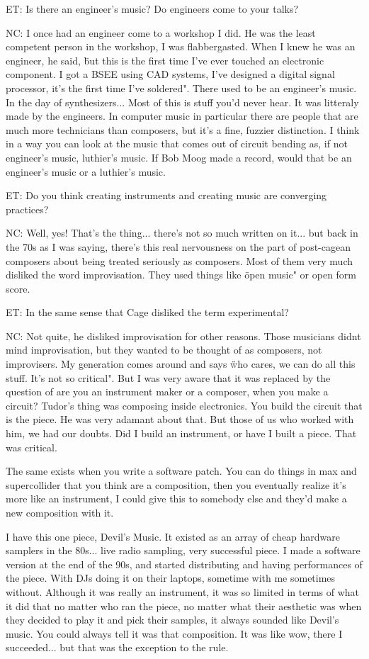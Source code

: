 ET: Is there an engineer's music? Do engineers come to your talks? 

NC: I once had an engineer come to a workshop I did. He was the least competent person in the workshop, I was flabbergasted. When I knew he was an engineer, he said, \"but this is the first time I've ever touched an electronic component. I got a BSEE using CAD systems, I've designed a digital signal processor, it's the first time I've soldered". There used to be an engineer's music. In the day of synthesizers... Most of this is stuff you'd never hear. It was litteraly made by the engineers. In computer music in particular there are people that are much more technicians than composers, but it's a fine, fuzzier distinction. I think in a way you can look at the music that comes out of circuit bending as, if not engineer's music, luthier's music. If Bob Moog made a record, would that be an engineer's music or a luthier's music. 

ET: Do you think creating instruments and creating music are converging practices? 

NC: Well, yes! That's the thing... there's not so much written on it... but back in the 70s as I was saying, there's this real nervousness on the part of post-cagean composers about being treated seriously as composers. Most of them very much disliked the word improvisation. They used things like \"open music" or open form score.

ET: In the same sense that Cage disliked the term experimental? 

NC: Not quite, he disliked improvisation for other reasons. Those musicians didnt mind improvisation, but they wanted to be thought of as composers, not improvisers. My generation comes around and says \"who cares, we can do all this stuff. It's not so critical". But I was very aware that it was replaced by the question of are you an instrument maker or a composer, when you make a circuit? Tudor's thing was composing inside electronics. You build the circuit that is the piece. He was very adamant about that. But those of us who worked with him, we had our doubts. Did I build an instrument, or have I built a piece. That was critical. 

The same exists when you write a software patch. You can do things in max and supercollider that you think are a composition, then you eventually realize it's more like an instrument, I could give this to somebody else and they'd make a new composition with it. 

I have this one piece, Devil's Music. It existed as an array of cheap hardware samplers in the 80s... live radio sampling, very successful piece. I made a software version at the end of the 90s, and started distributing and having performances of the piece. With DJs doing it on their laptops, sometime with me sometimes without. Although it was really an instrument, it was so limited in terms of what it did that no matter who ran the piece, no matter what their aesthetic was when they decided to play it and pick their samples, it always sounded like Devil's music. You could always tell it was that composition. It was like wow, there I succeeded... but that was the exception to the rule. 

